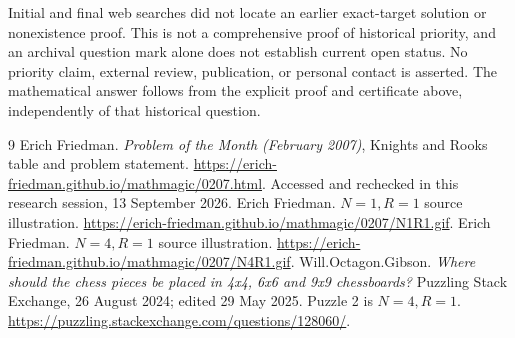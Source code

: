 \documentclass[11pt]{article}
\begin{document}
Initial and final web searches did not locate an earlier exact-target
solution or nonexistence proof. This is not a comprehensive proof of
historical priority, and an archival question mark alone does not establish
current open status. No priority claim, external review, publication, or
personal contact is asserted. The mathematical answer follows from the
explicit proof and certificate above, independently of that historical
question.

\begin{thebibliography}{9}
 Erich Friedman. \emph{Problem of the Month (February 2007)},
Knights and Rooks table and problem statement.
\url{https://erich-friedman.github.io/mathmagic/0207.html}.
Accessed and rechecked in this research session, 13 September 2026.
 Erich Friedman. \(N=1,R=1\) source illustration.
\url{https://erich-friedman.github.io/mathmagic/0207/N1R1.gif}.
 Erich Friedman. \(N=4,R=1\) source illustration.
\url{https://erich-friedman.github.io/mathmagic/0207/N4R1.gif}.
 Will.Octagon.Gibson. \emph{Where should the chess pieces be
placed in 4x4, 6x6 and 9x9 chessboards?} Puzzling Stack Exchange,
26 August 2024; edited 29 May 2025. Puzzle 2 is \(N=4,R=1\).
\url{https://puzzling.stackexchange.com/questions/128060/}.
\end{thebibliography}
\end{document}
